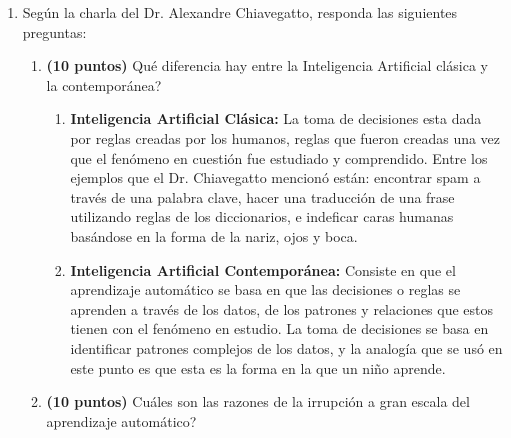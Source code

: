\documentclass[english]{article}
\begin{document}
\begin{enumerate}
\item Seg\'{u}n la charla del Dr. Alexandre Chiavegatto, responda las siguientes
preguntas:
\begin{enumerate}
\item \textbf{(10 puntos)} Qu\'{e} diferencia hay entre la Inteligencia
Artificial cl\'{a}sica y la contempor\'{a}nea?

\begin{enumerate}
    \item \textbf{Inteligencia Artificial Cl\'{a}sica:}
La toma de decisiones esta dada por reglas creadas por los humanos, reglas que fueron creadas una vez que el fen\'{o}meno en cuesti\'{o}n fue estudiado y comprendido. Entre los ejemplos que el Dr. Chiavegatto mencion\'{o} est\'{a}n: encontrar spam a trav\'{e}s de una palabra clave, hacer una traducci\'{o}n de una frase utilizando reglas de los diccionarios, e indeficar caras humanas bas\'{a}ndose en la forma de la nariz, ojos y boca.\\
    \item \textbf{Inteligencia Artificial Contempor\'{a}nea:}
Consiste en que el aprendizaje autom\'{a}tico se basa en que las decisiones o reglas se aprenden a trav\'{e}s de los datos, de los patrones y relaciones que estos tienen con el fen\'{o}meno en estudio. La toma de decisiones se basa en identificar patrones complejos de los datos, y la analog\'{i}a que se us\'{o} en este punto es que esta es la forma en la que un ni\~{n}o aprende.\\
\end{enumerate}


\item \textbf{(10 puntos)} Cu\'{a}les son las razones de la irrupci\'{o}n
a gran escala del aprendizaje autom\'{a}tico?


\end{enumerate}
\end{enumerate}
\end{document}
